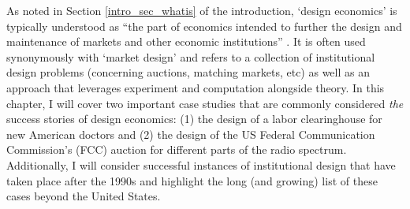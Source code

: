 
As noted in Section \ref{intro_sec_whatis} of the introduction, `design economics' is typically understood as ``the part of economics intended to further the design and maintenance of markets and other economic institutions'' \autocite[p1341]{roth2002}. It is often used synonymously with `market design' and refers to a collection of institutional design problems (concerning auctions, matching markets, etc) as well as an approach that leverages experiment and computation alongside theory. In this chapter, I will cover two important case studies that are commonly considered \textit{the} success stories of design economics: (1) the design of a labor clearinghouse for new American doctors and (2) the design of the US Federal Communication Commission's (FCC) auction for different parts of the radio spectrum. Additionally, I will consider successful instances of institutional design that have taken place after the 1990s and highlight the long (and growing) list of these cases beyond the United States.

